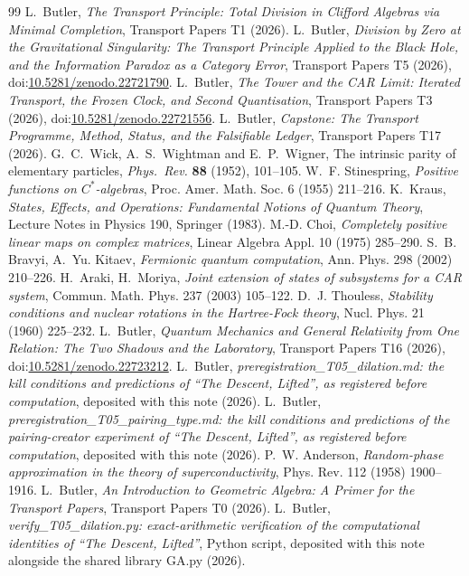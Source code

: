 \documentclass[11pt]{article}
\theoremstyle{definition}
\theoremstyle{plain}
\begin{document}
\begin{thebibliography}{99}
 L.~Butler,
\emph{The Transport Principle: Total Division in Clifford Algebras via Minimal Completion},
Transport Papers T1 (2026).
 L.~Butler,
\emph{Division by Zero at the Gravitational Singularity: The Transport Principle Applied to the Black Hole, and the Information Paradox as a Category Error},
Transport Papers T5 (2026), doi:\href{https://doi.org/10.5281/zenodo.22721790}{10.5281/zenodo.22721790}.
 L.~Butler,
\emph{The Tower and the CAR Limit: Iterated Transport, the Frozen Clock, and Second Quantisation},
Transport Papers T3 (2026), doi:\href{https://doi.org/10.5281/zenodo.22721556}{10.5281/zenodo.22721556}.
 L.~Butler,
\emph{Capstone: The Transport Programme, Method, Status, and the Falsifiable Ledger},
Transport Papers T17 (2026).
 G.~C.~Wick, A.~S.~Wightman and E.~P.~Wigner,
The intrinsic parity of elementary particles,
\emph{Phys.\ Rev.} \textbf{88} (1952), 101--105.
 W.~F. Stinespring,
\emph{Positive functions on $C^{*}$-algebras},
Proc. Amer. Math. Soc. 6 (1955) 211--216.
 K.~Kraus,
\emph{States, Effects, and Operations: Fundamental Notions of Quantum Theory},
Lecture Notes in Physics 190, Springer (1983).
 M.-D. Choi,
\emph{Completely positive linear maps on complex matrices},
Linear Algebra Appl. 10 (1975) 285--290.
 S.~B. Bravyi, A.~Yu. Kitaev,
\emph{Fermionic quantum computation},
Ann. Phys. 298 (2002) 210--226.
 H.~Araki, H.~Moriya,
\emph{Joint extension of states of subsystems for a CAR system},
Commun. Math. Phys. 237 (2003) 105--122.
 D.~J. Thouless,
\emph{Stability conditions and nuclear rotations in the Hartree-Fock theory},
Nucl. Phys. 21 (1960) 225--232.
 L.~Butler,
\emph{Quantum Mechanics and General Relativity from One Relation: The Two Shadows and the Laboratory},
Transport Papers T16 (2026), doi:\href{https://doi.org/10.5281/zenodo.22723212}{10.5281/zenodo.22723212}.
 L.~Butler,
\emph{preregistration\_T05\_dilation.md: the kill conditions and predictions of ``The Descent, Lifted'', as registered before computation},
deposited with this note (2026).
 L.~Butler,
\emph{preregistration\_T05\_pairing\_type.md: the kill conditions and predictions of the pairing-creator experiment of ``The Descent, Lifted'', as registered before computation},
deposited with this note (2026).
 P.~W. Anderson,
\emph{Random-phase approximation in the theory of superconductivity},
Phys. Rev. 112 (1958) 1900--1916.
 L.~Butler,
\emph{An Introduction to Geometric Algebra: A Primer for the Transport Papers},
Transport Papers T0 (2026).
 L.~Butler,
\emph{verify\_T05\_dilation.py: exact-arithmetic verification of the computational identities of ``The Descent, Lifted''},
Python script, deposited with this note alongside the shared library GA.py (2026).
\end{thebibliography}
\end{document}
